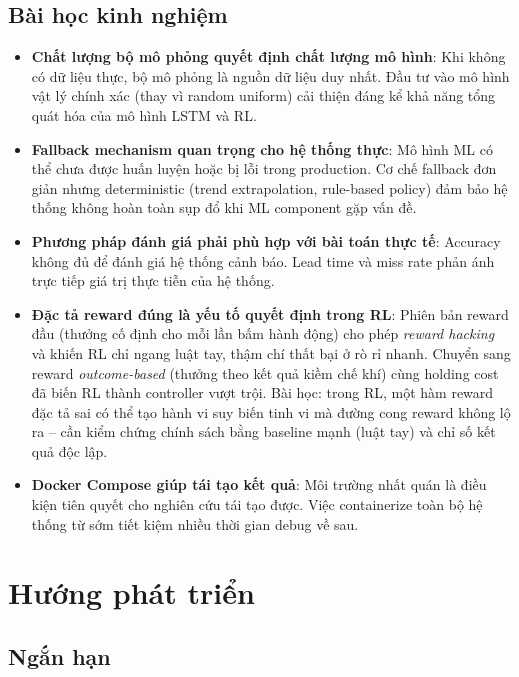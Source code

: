 \subsection{Bài học kinh nghiệm}

\begin{itemize}
  \item \textbf{Chất lượng bộ mô phỏng quyết định chất lượng mô hình}: Khi không có dữ liệu thực, bộ mô phỏng là nguồn dữ liệu duy nhất. Đầu tư vào mô hình vật lý chính xác (thay vì random uniform) cải thiện đáng kể khả năng tổng quát hóa của mô hình LSTM và RL.

  \item \textbf{Fallback mechanism quan trọng cho hệ thống thực}: Mô hình ML có thể chưa được huấn luyện hoặc bị lỗi trong production. Cơ chế fallback đơn giản nhưng deterministic (trend extrapolation, rule-based policy) đảm bảo hệ thống không hoàn toàn sụp đổ khi ML component gặp vấn đề.

  \item \textbf{Phương pháp đánh giá phải phù hợp với bài toán thực tế}: Accuracy không đủ để đánh giá hệ thống cảnh báo. Lead time và miss rate phản ánh trực tiếp giá trị thực tiễn của hệ thống.

  \item \textbf{Đặc tả reward đúng là yếu tố quyết định trong RL}: Phiên bản reward đầu (thưởng cố định cho mỗi lần bấm hành động) cho phép \textit{reward hacking} và khiến RL chỉ ngang luật tay, thậm chí thất bại ở rò rỉ nhanh. Chuyển sang reward \textit{outcome-based} (thưởng theo kết quả kiềm chế khí) cùng holding cost đã biến RL thành controller vượt trội. Bài học: trong RL, một hàm reward đặc tả sai có thể tạo hành vi suy biến tinh vi mà đường cong reward không lộ ra -- cần kiểm chứng chính sách bằng baseline mạnh (luật tay) và chỉ số kết quả độc lập.

  \item \textbf{Docker Compose giúp tái tạo kết quả}: Môi trường nhất quán là điều kiện tiên quyết cho nghiên cứu tái tạo được. Việc containerize toàn bộ hệ thống từ sớm tiết kiệm nhiều thời gian debug về sau.
\end{itemize}

\section{Hướng phát triển}

\subsection{Ngắn hạn}

